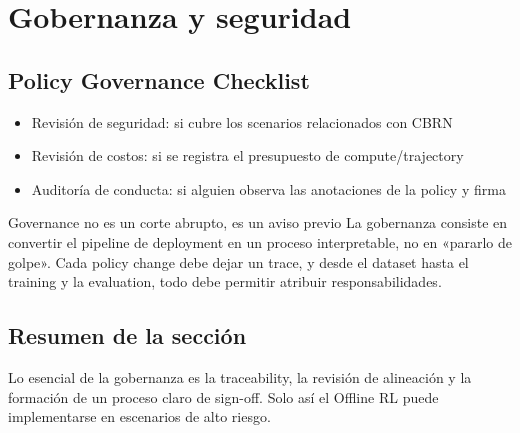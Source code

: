\section{Gobernanza y seguridad}

\subsection{Policy Governance Checklist}

\begin{itemize}
    \item Revisión de seguridad: si cubre los scenarios relacionados con CBRN
    \item Revisión de costos: si se registra el presupuesto de compute/trajectory
    \item Auditoría de conducta: si alguien observa las anotaciones de la policy y firma
\end{itemize}

\begin{knowledgebox}{Governance no es un corte abrupto, es un aviso previo}
La gobernanza consiste en convertir el pipeline de deployment en un proceso interpretable, no en «pararlo de golpe». Cada policy change debe dejar un trace, y desde el dataset hasta el training y la evaluation, todo debe permitir atribuir responsabilidades.
\end{knowledgebox}

\subsection{Resumen de la sección}

Lo esencial de la gobernanza es la traceability, la revisión de alineación y la formación de un proceso claro de sign-off. Solo así el Offline RL puede implementarse en escenarios de alto riesgo.

